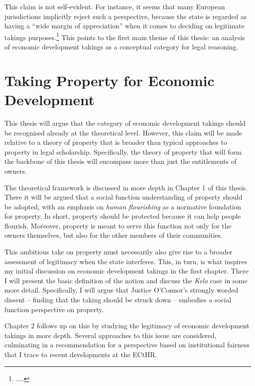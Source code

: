 This claim is not self-evident. For instance, it seems that many European jurisdictions implicitly reject such a perspective, because the state is regarded as having a ``wide margin of appreciation'' when it comes to deciding on legitimate takings purposes.\footnote{....} This points to the first main theme of this thesis: an analysis of economic development takings as a conceptual category for legal reasoning. %

\section{Taking Property for Economic Development}\label{sec:1:1}

This thesis will argue that the category of economic development takings should be recognised already at the theoretical level. However, this claim will be made relative to a theory of property that is broader than typical approaches to property in legal scholarship. Specifically, the theory of property that will form the backbone of this thesis will encompass more than just the entitlements of owners. 

The theoretical framework is discussed in more depth in Chapter 1 of this thesis. There it will be argued that a social function understanding of property should be adopted, with an emphasis on {\it human flourishing} as a normative foundation for property. In short, property should be protected because it can help people flourish. Moreover, property is meant to serve this function not only for the owners themselves, but also for the other members of their communities.

This ambitious take on property must necessarily also give rise to a broader assessment of legitimacy when the state interferes. This, in turn, is what inspires my initial discussion on economic development takings in the first chapter. There I will present the basic definition of the notion and discuss the {\it Kelo} case in some more detail. Specifically, I will argue that Justice O'Connor's strongly worded dissent -- finding that the taking should be struck down -- embodies a social function perspective on property.

Chapter 2 follows up on this by studying the legitimacy of economic development takings in more depth. Several approaches to this issue are considered, culminating in a recommendation for a perspective based on institutional fairness that I trace to recent developments at the ECtHR. 

